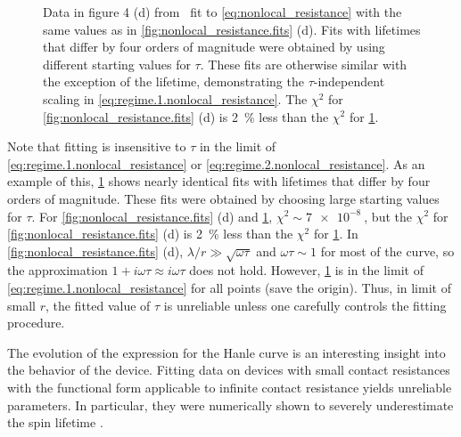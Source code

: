 \begin{figure}
  \caption{%
    Data in figure 4 (d) from~\cite{PhysRevLett.105.167202}
    fit to \cref{eq:nonlocal_resistance}
    with the same values as in
    \cref{fig:nonlocal_resistance.fits} (d).
    Fits with lifetimes that differ by four orders of magnitude
    were obtained by using different starting values for $τ$.
    These fits are otherwise similar with the exception of the lifetime,
    demonstrating the $τ$-independent scaling in
    \cref{eq:regime.1.nonlocal_resistance}.
    The $χ^2$ for \cref{fig:nonlocal_resistance.fits} (d)
    is \SI{2}{\percent} less than the $χ^2$ for
    \cref{fig:nonlocal_resistance.large_lifetime}.
  }\label{fig:nonlocal_resistance.large_lifetime}
\end{figure}

Note that fitting is insensitive to $τ$ in the limit of
\cref{eq:regime.1.nonlocal_resistance}
or \cref{eq:regime.2.nonlocal_resistance}.
As an example of this,
\cref{fig:nonlocal_resistance.large_lifetime} shows nearly identical fits
with lifetimes that differ by four orders of magnitude.
These fits were obtained by choosing large starting values for $τ$.
For \cref{fig:nonlocal_resistance.fits} (d)
and \cref{fig:nonlocal_resistance.large_lifetime},
$χ^2 ∼ \SI{7e-8}{}$, but the $χ^2$ for
\cref{fig:nonlocal_resistance.fits} (d)
is \SI{2}{\percent} less than the $χ^2$ for
\cref{fig:nonlocal_resistance.large_lifetime}.
In \cref{fig:nonlocal_resistance.fits} (d),
$λ / r ≫ \sqrt{ω τ}$ and $ω τ ∼ 1$ for most of the curve,
so the approximation $1 + i ω τ ≈ i ω τ$ does not hold.
However, \cref{fig:nonlocal_resistance.large_lifetime}
is in the limit of \cref{eq:regime.1.nonlocal_resistance}
for all points (save the origin).
Thus, in limit of small $r$, the fitted value of $τ$ is unreliable
unless one carefully controls the fitting procedure.

The evolution of the expression for the Hanle curve
is an interesting insight into the behavior of the device.
Fitting data on devices with small contact resistances
with the functional form applicable to infinite contact resistance
yields unreliable parameters.
In particular, they were numerically shown
to severely underestimate the spin lifetime
\cite{PhysRevB.86.235408}.

